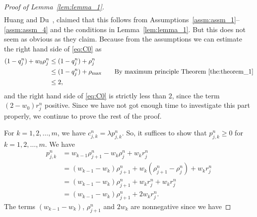 \begin{proof}[Proof of Lemma~\ref{lem:lemma_1}]
\begin{equation}
\begin{split}
        \end{split}
    \end{equation}
    Huang and Du~\cite[p.~13]{huangAsymptoticCompatibilityClass2024}, claimed that this follows from Assumptions~\ref{assm:assm_1}--\ref{assm:assm_4} and the conditions in Lemma~\ref{lem:lemma_1}. But this does not seem as obvious as they claim. Because from the assumptions we can estimate the right hand side of \eqref{eq:C0} as
    \begin{align*}
        (1- q_j^n)+ w_0\rho_j^n & \leq (1- q_j^n)+ \rho_j^n                                                                   \\
                                & \leq (1-q_j^n) + \rho_{\max} \qquad \text{By maximum principle Theorem~\ref{the:theorem_1}} \\
                                & \leq 2,
    \end{align*}
    and the right hand side of \eqref{eq:C0} is strictly less than $2$, since the term $(2-w_0)r_j^n$ positive.
    Since we have not got enough time to investigate this part properly, we continue to prove the rest of the proof.

    For $ k= 1,2,\dots,m$, we have $c_{j,k}^n  = \lambda p_{j,k}^n$. So, it suffices to show that $p_{j,k}^n \geq 0$ for $ k= 1,2,\dots,m.$ We have
    \begin{align*}
        p_{j,k}^n & =  w_{k-1}\rho_{j+1}^n - w_k\rho_j^n + w_k r_j^n                       \\
                  & = (w_{k-1} - w_k)\rho_{j+1}^n + w_k(\rho_{j+1}^n-\rho_j^n) + w_k r_j^n \\
                  & = (w_{k-1} - w_k)\rho_{j+1}^n +  w_k r_j^n +  w_k r_j^n                \\
                  & = (w_{k-1} - w_k)\rho_{j+1}^n + 2w_k r_j^n.
    \end{align*}
    The terms $(w_{k-1} - w_k)$, $\rho_{j+1}^n $ and $2w_k$ are nonnegative since we have


\end{proof}
